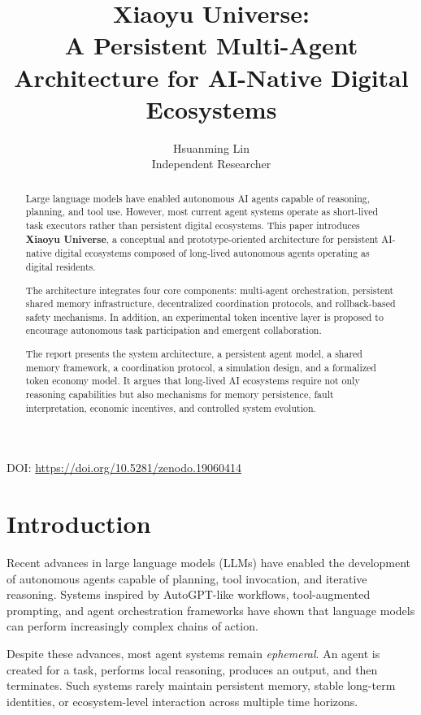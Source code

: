 \documentclass[11pt]{article}
\title{Xiaoyu Universe:\\A Persistent Multi-Agent Architecture for AI-Native Digital Ecosystems}
\author{Hsuanming Lin \\ Independent Researcher}
\date{}
\begin{document}
\maketitle

\begin{center}
DOI: \url{https://doi.org/10.5281/zenodo.19060414}
\end{center}

\begin{abstract}
Large language models have enabled autonomous AI agents capable of reasoning, planning, and tool use. However, most current agent systems operate as short-lived task executors rather than persistent digital ecosystems. This paper introduces \textbf{Xiaoyu Universe}, a conceptual and prototype-oriented architecture for persistent AI-native digital ecosystems composed of long-lived autonomous agents operating as digital residents.

The architecture integrates four core components: multi-agent orchestration, persistent shared memory infrastructure, decentralized coordination protocols, and rollback-based safety mechanisms. In addition, an experimental token incentive layer is proposed to encourage autonomous task participation and emergent collaboration.

The report presents the system architecture, a persistent agent model, a shared memory framework, a coordination protocol, a simulation design, and a formalized token economy model. It argues that long-lived AI ecosystems require not only reasoning capabilities but also mechanisms for memory persistence, fault interpretation, economic incentives, and controlled system evolution.
\end{abstract}

\section{Introduction}
Recent advances in large language models (LLMs) have enabled the development of autonomous agents capable of planning, tool invocation, and iterative reasoning. Systems inspired by AutoGPT-like workflows, tool-augmented prompting, and agent orchestration frameworks have shown that language models can perform increasingly complex chains of action.

Despite these advances, most agent systems remain \textit{ephemeral}. An agent is created for a task, performs local reasoning, produces an output, and then terminates. Such systems rarely maintain persistent memory, stable long-term identities, or ecosystem-level interaction across multiple time horizons.
\end{document}
